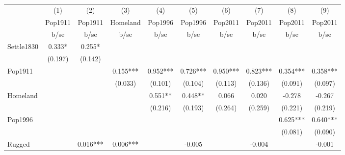 {
\def\sym#1{\ifmmode^{#1}\else\(^{#1}\)\fi}
\begin{tabular}{l*{9}{c}}
\hline\hline
                    &\multicolumn{1}{c}{(1)}&\multicolumn{1}{c}{(2)}&\multicolumn{1}{c}{(3)}&\multicolumn{1}{c}{(4)}&\multicolumn{1}{c}{(5)}&\multicolumn{1}{c}{(6)}&\multicolumn{1}{c}{(7)}&\multicolumn{1}{c}{(8)}&\multicolumn{1}{c}{(9)}\\
                    &\multicolumn{1}{c}{Pop1911}&\multicolumn{1}{c}{Pop1911}&\multicolumn{1}{c}{Homeland}&\multicolumn{1}{c}{Pop1996}&\multicolumn{1}{c}{Pop1996}&\multicolumn{1}{c}{Pop2011}&\multicolumn{1}{c}{Pop2011}&\multicolumn{1}{c}{Pop2011}&\multicolumn{1}{c}{Pop2011}\\
                    &        b/se   &        b/se   &        b/se   &        b/se   &        b/se   &        b/se   &        b/se   &        b/se   &        b/se   \\
\hline
Settle1830          &       0.333*  &       0.255*  &               &               &               &               &               &               &               \\
                    &     (0.197)   &     (0.142)   &               &               &               &               &               &               &               \\
Pop1911             &               &               &       0.155***&       0.952***&       0.726***&       0.950***&       0.823***&       0.354***&       0.358***\\
                    &               &               &     (0.033)   &     (0.101)   &     (0.104)   &     (0.113)   &     (0.136)   &     (0.091)   &     (0.097)   \\
Homeland            &               &               &               &       0.551** &       0.448** &       0.066   &       0.020   &      -0.278   &      -0.267   \\
                    &               &               &               &     (0.216)   &     (0.193)   &     (0.264)   &     (0.259)   &     (0.221)   &     (0.219)   \\
Pop1996             &               &               &               &               &               &               &               &       0.625***&       0.640***\\
                    &               &               &               &               &               &               &               &     (0.081)   &     (0.090)   \\
Rugged              &               &       0.016***&       0.006***&               &      -0.005   &               &      -0.004   &               &      -0.001   \\

\end{tabular}}
